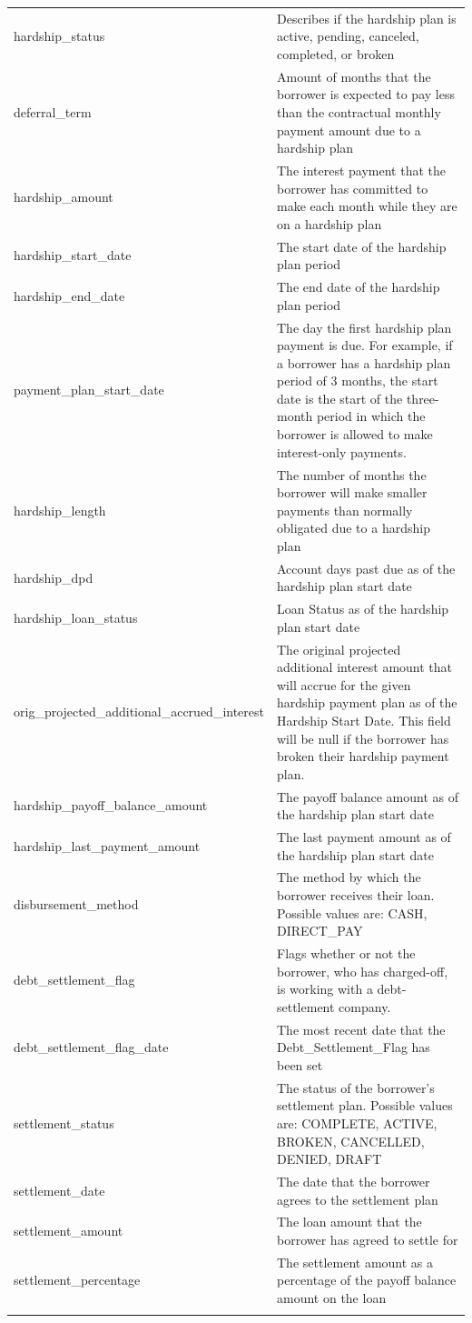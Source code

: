 \documentclass[11pt,]{report}
\begin{document}
\begin{longtable}[t]{>{\raggedright\arraybackslash}p{7cm}>{\raggedright\arraybackslash}p{7cm}}
hardship\_status & Describes if the hardship plan is active, pending, canceled, completed, or broken\\
deferral\_term & Amount of months that the borrower is expected to pay less than the contractual monthly payment amount due to a hardship plan\\
\addlinespace
hardship\_amount & The interest payment that the borrower has committed to make each month while they are on a hardship plan\\
hardship\_start\_date & The start date of the hardship plan period\\
hardship\_end\_date & The end date of the hardship plan period\\
payment\_plan\_start\_date & The day the first hardship plan payment is due. For example, if a borrower has a hardship plan period of 3 months, the start date is the start of the three-month period in which the borrower is allowed to make interest-only payments.\\
hardship\_length & The number of months the borrower will make smaller payments than normally obligated due to a hardship plan\\
\addlinespace
hardship\_dpd & Account days past due as of the hardship plan start date\\
hardship\_loan\_status & Loan Status as of the hardship plan start date\\
orig\_projected\_additional\_accrued\_interest & The original projected additional interest amount that will accrue for the given hardship payment plan as of the Hardship Start Date. This field will be null if the borrower has broken their hardship payment plan.\\
hardship\_payoff\_balance\_amount & The payoff balance amount as of the hardship plan start date\\
hardship\_last\_payment\_amount & The last payment amount as of the hardship plan start date\\
\addlinespace
disbursement\_method & The method by which the borrower receives their loan. Possible values are: CASH, DIRECT\_PAY\\
debt\_settlement\_flag & Flags whether or not the borrower, who has charged-off, is working with a debt-settlement company.\\
debt\_settlement\_flag\_date & The most recent date that the Debt\_Settlement\_Flag has been set  \\
settlement\_status & The status of the borrower’s settlement plan. Possible values are: COMPLETE, ACTIVE, BROKEN, CANCELLED, DENIED, DRAFT\\
settlement\_date & The date that the borrower agrees to the settlement plan\\
\addlinespace
settlement\_amount & The loan amount that the borrower has agreed to settle for\\
settlement\_percentage & The settlement amount as a percentage of the payoff balance amount on the loan\\*
\end{longtable}
\end{document}
